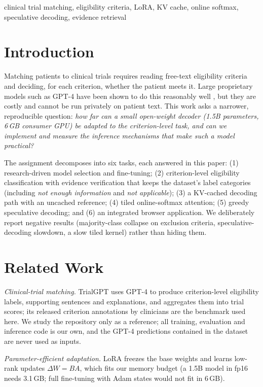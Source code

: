 \documentclass[conference]{IEEEtran}
\begin{document}
\begin{IEEEkeywords}
clinical trial matching, eligibility criteria, LoRA, KV cache, online softmax, speculative decoding, evidence retrieval
\end{IEEEkeywords}

\section{Introduction}
Matching patients to clinical trials requires reading free-text eligibility criteria and deciding, for each criterion, whether the patient meets it. Large proprietary models such as GPT-4 have been shown to do this reasonably well \cite{jin2024trialgpt}, but they are costly and cannot be run privately on patient text. This work asks a narrower, reproducible question: \emph{how far can a small open-weight decoder (1.5B parameters, 6\,GB consumer GPU) be adapted to the criterion-level task, and can we implement and measure the inference mechanisms that make such a model practical?}

The assignment decomposes into six tasks, each answered in this paper: (1) research-driven model selection and fine-tuning; (2) criterion-level eligibility classification with evidence verification that keeps the dataset's label categories (including \emph{not enough information} and \emph{not applicable}); (3) a KV-cached decoding path with an uncached reference; (4) tiled online-softmax attention; (5) greedy speculative decoding; and (6) an integrated browser application. We deliberately report negative results (majority-class collapse on exclusion criteria, speculative-decoding slowdown, a slow tiled kernel) rather than hiding them.

\section{Related Work}
\textit{Clinical-trial matching.} TrialGPT \cite{jin2024trialgpt} uses GPT-4 to produce criterion-level eligibility labels, supporting sentences and explanations, and aggregates them into trial scores; its released criterion annotations by clinicians are the benchmark used here. We study the repository only as a reference; all training, evaluation and inference code is our own, and the GPT-4 predictions contained in the dataset are never used as inputs.

\textit{Parameter-efficient adaptation.} LoRA \cite{hu2022lora} freezes the base weights and learns low-rank updates $\Delta W = BA$, which fits our memory budget (a 1.5B model in fp16 needs 3.1\,GB; full fine-tuning with Adam states would not fit in 6\,GB).
\end{document}
